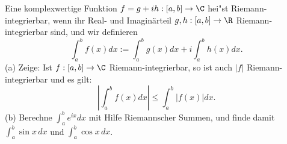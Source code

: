 \begin{prob}
Eine komplexwertige Funktion $f=g+ih:[a,b]\to\C$ hei"st
Riemann-integrierbar, wenn ihr Real- und Imagin\"arteil
$g,h:[a,b]\to\R$ Riemann-integrierbar sind, und wir definieren 
$$
\int_a^bf(x)dx := \int_a^bg(x)dx + i\int_a^bh(x)dx.
$$
(a) Zeige: Ist $f:[a,b]\to\C$ Riemann-integrierbar, so ist auch $|f|$
Riemann-integrierbar und es gilt:
$$
|\int_a^bf(x)dx| \leq \int_a^b|f(x)|dx.
$$
(b) Berechne $\int_a^be^{ix}dx$ mit Hilfe Riemannscher Summen, und
finde damit $\int_a^b\sin x\,dx$ und $\int_a^b\cos x\,dx$.
\end{prob}
